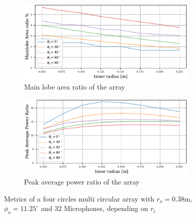 \begin{figure}[h!]
	\centering
	\begin{subfigure}[b]{1\textwidth}
		\centering
		\includegraphics[width=0.95\textwidth]{images/5_array_evaluation/final_flat_area.pdf}
		\caption{Main lobe area ratio of the array}
		\label{fig:finar}
	\end{subfigure}
	\begin{subfigure}[b]{1\textwidth}
		\centering
		\includegraphics[width=0.95\textwidth]{images/5_array_evaluation/final_flat_PAP.pdf}
		\caption{Peak average power ratio of the array}
		\label{fig:finpap}
	\end{subfigure}
	\caption{Metrics of a four circles multi circular array with $r_o=0.38$m, 
	$\phi_o = 11.25^\circ$ and 32 Microphones, depending on $r_i$ }
	\label{fig:finflat}
\end{figure}

